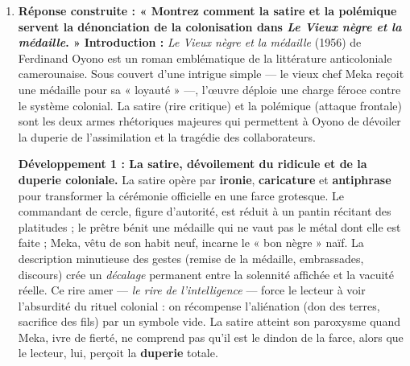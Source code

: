 \documentclass[11pt]{article}
\newcommand{\cle}[1]{{\popxbold\color{popdark}#1}}
\begin{document}
\begin{corrige}
\begin{enumerate}
\begin{enumerate}
\textit{Cible :} La collaboration du chef Meka (aliénation volontaire) et l'injustice coloniale.
\textit{Procédés :} \textbf{Exagération} (générosité démesurée de Meka), \textbf{Contraste} (richesse donnée / médaille de toc reçue), \textbf{Satire} du naïf qui croit à la reconnaissance.
\textit{Effet :} Pitié critique pour Meka, condamnation du système qui exploite la loyauté.
\end{enumerate}
\item \textbf{Réponse construite : « Montrez comment la satire et la polémique servent la dénonciation de la colonisation dans \emph{Le Vieux nègre et la médaille}. »}
\textbf{Introduction :} 
\emph{Le Vieux nègre et la médaille} (1956) de Ferdinand Oyono est un roman emblématique de la littérature anticoloniale camerounaise. Sous couvert d'une intrigue simple — le vieux chef Meka reçoit une médaille pour sa « loyauté » —, l'œuvre déploie une charge féroce contre le système colonial. La \cle{satire} (rire critique) et la \cle{polémique} (attaque frontale) sont les deux armes rhétoriques majeures qui permettent à Oyono de dévoiler la duperie de l'assimilation et la tragédie des collaborateurs.

\textbf{Développement 1 : La satire, dévoilement du ridicule et de la duperie coloniale.}
La satire opère par \textbf{ironie}, \textbf{caricature} et \textbf{antiphrase} pour transformer la cérémonie officielle en une farce grotesque. Le commandant de cercle, figure d'autorité, est réduit à un pantin récitant des platitudes ; le prêtre bénit une médaille qui ne vaut pas le métal dont elle est faite ; Meka, vêtu de son habit neuf, incarne le « bon nègre » naïf. La description minutieuse des gestes (remise de la médaille, embrassades, discours) crée un \emph{décalage} permanent entre la solennité affichée et la vacuité réelle. Ce rire amer — \emph{le rire de l'intelligence} — force le lecteur à voir l'absurdité du rituel colonial : on récompense l'aliénation (don des terres, sacrifice des fils) par un symbole vide. La satire atteint son paroxysme quand Meka, ivre de fierté, ne comprend pas qu'il est le dindon de la farce, alors que le lecteur, lui, perçoit la \textbf{duperie} totale.


\end{enumerate}
\end{corrige}
\end{document}
